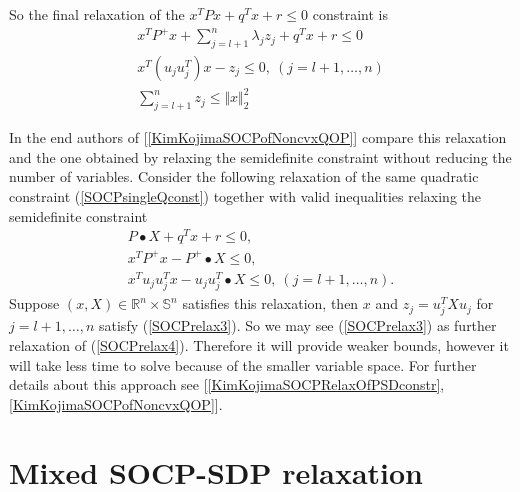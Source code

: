 \documentclass[12pt]{book}
\theoremstyle{definition}
\begin{document}
So the final relaxation of the  $x^TPx + q^Tx + r \leq 0$ constraint is
\begin{equation}
\begin{array}{l}
\label{SOCPrelax3}
x^TP^+x + \sum_{j = l + 1}^n \lambda_j z_j + q^Tx + r \leq 0 \\
x^T(u_ju_j^T)x - z_j \leq 0, \ ( j= l+1, \dots ,n) \\
\sum_{j=l+1}^n z_j \leq \Vert x\Vert_2^2
\end{array}
\end{equation}

In the end authors of [\ref{KimKojimaSOCPofNoncvxQOP}] compare this relaxation and the one obtained by relaxing the semidefinite constraint without reducing the number of variables.  Consider the following relaxation of the same quadratic constraint (\ref{SOCPsingleQconst})
together with valid inequalities relaxing the semidefinite constraint
\begin{equation}
\begin{array}{l}
\label{SOCPrelax4}
P\bullet X + q^Tx + r \leq 0,\\
x^TP^+x - P^+\bullet X \leq 0, \\
x^Tu_ju_j^Tx - u_ju_j^T\bullet X \leq 0, \ (j = l+1,\dots ,n).
\end{array}
\end{equation}
Suppose $(x,X) \in \mathbb{R}^n\times \mathbb{S}^n$ satisfies this relaxation, then $x$ and $z_j = u_j^TXu_j$ for $j = l+1,\dots ,n$ satisfy (\ref{SOCPrelax3}). So we may see (\ref{SOCPrelax3}) as further relaxation of (\ref{SOCPrelax4}).
Therefore it will provide weaker bounds, however it will take less time to solve because of the smaller variable space.  
For further details about this approach see  [\ref{KimKojimaSOCPRelaxOfPSDconstr}, \ref{KimKojimaSOCPofNoncvxQOP}].



\section{Mixed SOCP-SDP relaxation}
\label{SectionMixedSocpSDP}
\end{document}
